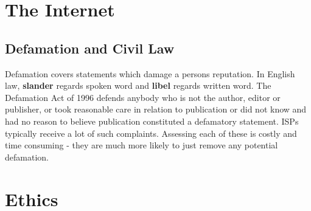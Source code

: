 \documentclass{article}
\begin{document}
	\section{The Internet}
	
	\subsection{Defamation and Civil Law}
	Defamation covers statements which damage a persons reputation. In English law, \textbf{slander} regards spoken word and \textbf{libel} regards written word. The Defamation Act of 1996 defends anybody who is not the author, editor or publisher, or took reasonable care in relation to publication or did not know and had no reason to believe publication constituted a defamatory statement. ISPs typically receive a lot of such complaints. Assessing each of these is costly and time consuming - they are much more likely to just remove any potential defamation.
	
	\section{Ethics}
	
	\newpage
	\printindex	
	
\end{document}
